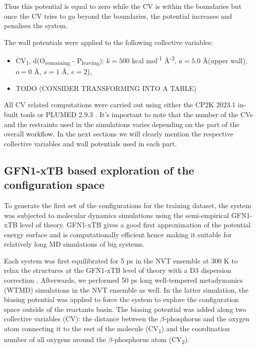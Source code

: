 Thus this potential is equal to zero while the CV is within the boundaries but once the CV tries to go beyond the boundaries, the potential increases and penalises the system.

The wall potentials were applied to the following collective variables:
\begin{itemize}
    \item CV\textsubscript{1}, d(O\textsubscript{remaining} - P\textsubscript{leaving}): $k = 500$ kcal mol\textsuperscript{-1} \AA\textsuperscript{-2}, $a = 5.0$ \AA (upper wall), $o = 0$ \AA, $s = 1$ \AA, $e = 2$),
    \item TODO (CONSIDER TRANSFORMING INTO A TABLE)
\end{itemize}

All CV related computations were carried out using either the CP2K 2023.1 in-built tools \citep{kuhneCP2KElectronicStructure2020} or PLUMED 2.9.3 \citep{tribelloPLUMED2New2014}. It's important to note that the number of the CVs and the restraints used in the simulations varies depending on the part of the overall workflow. In the next sections we will clearly mention the respective collective variables and wall potentials used in each part.



\subsection{GFN1-xTB based exploration of the configuration space}
\label{subsec:xtb-exploration-of-configuration-space}
To generate the first set of the configurations for the training dataset, the system was subjected to molecular dynamics simulations using the semi-empirical GFN1-xTB \citep{grimmeRobustAccurateTightBinding2017} level of theory. GFN1-xTB gives a good first approximation of the potential energy surface and is computationally efficient hence making it suitable for relatively long MD simulations of big systems. 

Each system was first equilibrated for 5 ps in the NVT ensemble at 300 K to relax the structures at the GFN1-xTB level of theory with a D3 dispersion correction \citep{grimmeConsistentAccurateInitio2010}. Afterwards, we performed 50 ps long well-tempered metadynamics (WTMD) \citep{barducciWellTemperedMetadynamicsSmoothly2008} simulations in the NVT ensemble as well. In the latter simulation, the biasing potential was applied to force the system to explore the configuration space outside of the reactants basin. The biasing potential was added along two collective variables (CV): the distance between the $\beta$-phosphorus and the oxygen atom connecting it to the rest of the molecule (CV\textsubscript{1}) and the coordination number of all oxygens around the $\beta$-phosphorus atom (CV\textsubscript{2}). 

